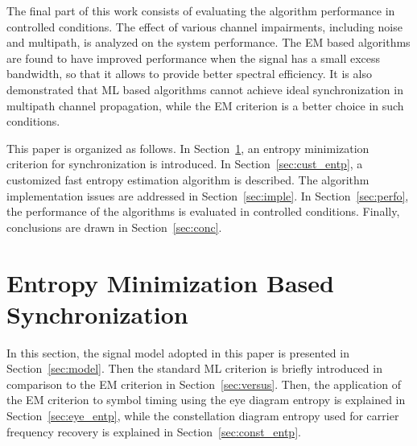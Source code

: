 \documentclass[12pt, draftclsnofoot, onecolumn]{IEEEtran}
\begin{document}
The final part of this work consists of evaluating the algorithm performance in controlled conditions. 
The effect of various channel impairments, including noise and multipath, is analyzed on the system performance.  
The EM based algorithms are found to have improved performance when the signal has a small excess bandwidth, so that it allows to provide better spectral efficiency.
It is also demonstrated that ML based algorithms cannot achieve ideal synchronization in multipath channel propagation, while the EM criterion is a better choice in such conditions. 



This paper is organized as follows.
In Section~\ref{sec:entropy},
an entropy minimization criterion for synchronization is introduced. 
In Section~\ref{sec:cust_entp}, a customized fast entropy estimation algorithm is described. 
The algorithm implementation issues are addressed in Section~\ref{sec:imple}.
In Section~\ref{sec:perfo}, the performance of the algorithms is evaluated in controlled conditions.
Finally, conclusions are drawn in Section~\ref{sec:conc}.

\section{Entropy Minimization Based Synchronization}
\label{sec:entropy}
In this section, the signal model adopted in this paper is presented in Section~\ref{sec:model}.
Then the standard ML criterion is briefly introduced in comparison to the EM criterion in Section~\ref{sec:versus}.
Then, the application of the EM criterion to symbol timing using the eye diagram entropy is explained in Section~\ref{sec:eye_entp},
while the constellation diagram entropy used for carrier frequency recovery is explained in Section~\ref{sec:const_entp}.
\end{document}
